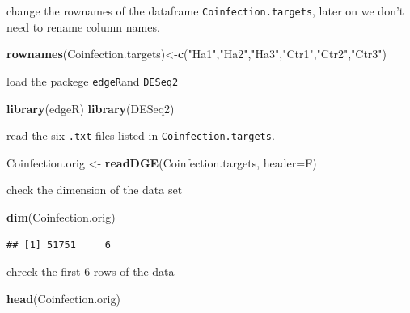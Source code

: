 \documentclass[
]{article}
\newenvironment{Shaded}{\begin{snugshade}}{\end{snugshade}}
\newcommand{\AttributeTok}[1]{\textcolor[rgb]{0.13,0.29,0.53}{#1}}
\newcommand{\FunctionTok}[1]{\textcolor[rgb]{0.13,0.29,0.53}{\textbf{#1}}}
\newcommand{\NormalTok}[1]{#1}
\newcommand{\OtherTok}[1]{\textcolor[rgb]{0.56,0.35,0.01}{#1}}
\newcommand{\StringTok}[1]{\textcolor[rgb]{0.31,0.60,0.02}{#1}}
\begin{document}
change the rownames of the dataframe \texttt{Coinfection.targets}, later
on we don't need to rename column names.

\begin{Shaded}
\begin{Highlighting}[]
\FunctionTok{rownames}\NormalTok{(Coinfection.targets)}\OtherTok{\textless{}{-}}\FunctionTok{c}\NormalTok{(}\StringTok{"Ha1"}\NormalTok{,}\StringTok{"Ha2"}\NormalTok{,}\StringTok{"Ha3"}\NormalTok{,}\StringTok{"Ctr1"}\NormalTok{,}\StringTok{"Ctr2"}\NormalTok{,}\StringTok{"Ctr3"}\NormalTok{)}
\end{Highlighting}
\end{Shaded}

load the packege \texttt{edgeR}and \texttt{DESeq2}

\begin{Shaded}
\begin{Highlighting}[]
\FunctionTok{library}\NormalTok{(edgeR)}
\FunctionTok{library}\NormalTok{(DESeq2)}
\end{Highlighting}
\end{Shaded}

read the six \texttt{.txt} files listed in \texttt{Coinfection.targets}.

\begin{Shaded}
\begin{Highlighting}[]
\NormalTok{Coinfection.orig }\OtherTok{\textless{}{-}} \FunctionTok{readDGE}\NormalTok{(Coinfection.targets, }\AttributeTok{header=}\NormalTok{F)}
\end{Highlighting}
\end{Shaded}

check the dimension of the data set

\begin{Shaded}
\begin{Highlighting}[]
\FunctionTok{dim}\NormalTok{(Coinfection.orig)}
\end{Highlighting}
\end{Shaded}

\begin{verbatim}
## [1] 51751     6
\end{verbatim}

chreck the first 6 rows of the data

\begin{Shaded}
\begin{Highlighting}[]
\FunctionTok{head}\NormalTok{(Coinfection.orig)}
\end{Highlighting}
\end{Shaded}
\end{document}

